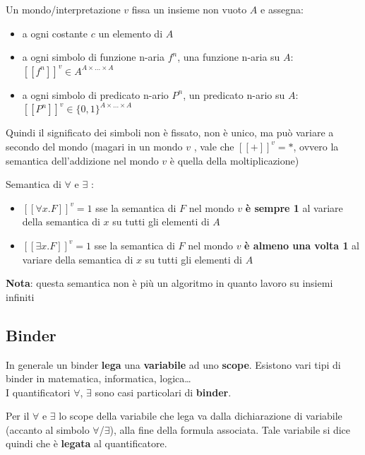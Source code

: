 \documentclass[
  a4paper,
]{article}
\providecommand{\tightlist}{%
  \setlength{\itemsep}{0pt}\setlength{\parskip}{0pt}}
\begin{document}
Un mondo/interpretazione \(v\) fissa un insieme non vuoto \(A\) e
assegna:

\begin{itemize}
\tightlist
\item
  a ogni costante \(c\) un elemento di \(A\)
\item
  a ogni simbolo di funzione n-aria \(f^n\), una funzione n-aria su
  \(A\): \([[f^n]]^v \in A^{A \times \dots \times A}\)
\item
  a ogni simbolo di predicato n-ario \(P^n\), un predicato n-ario su
  \(A\): \([[P^n]]^v \in \{0, 1\}^{A \times \dots \times A}\)
\end{itemize}

Quindi il significato dei simboli non è fissato, non è unico, ma può
variare a secondo del mondo (magari in un mondo \(v\) , vale che
\([[+]]^v = *\), ovvero la semantica dell'addizione nel mondo \(v\) è
quella della moltiplicazione)

Semantica di \(\forall\) e \(\exists\) :

\begin{itemize}
\tightlist
\item
  \([[\forall x.F]]^v = 1\) sse la semantica di \(F\) nel mondo \(v\)
  \textbf{è sempre 1} al variare della semantica di \(x\) su tutti gli
  elementi di \(A\)
\item
  \([[\exists x.F]]^v = 1\) sse la semantica di \(F\) nel mondo \(v\)
  \textbf{è almeno una volta 1} al variare della semantica di \(x\) su
  tutti gli elementi di \(A\)
\end{itemize}

\textbf{Nota}: questa semantica non è più un algoritmo in quanto lavoro
su insiemi infiniti

\hypertarget{binder}{%
\subsection{Binder}\label{binder}}

In generale un binder \textbf{lega} una \textbf{variabile} ad uno
\textbf{scope}. Esistono vari tipi di binder in matematica, informatica,
logica\ldots{}\\
I quantificatori \(\forall\), \(\exists\) sono casi particolari di
\textbf{binder}.

Per il \(\forall\) e \(\exists\) lo scope della variabile che lega va
dalla dichiarazione di variabile (accanto al simbolo
\(\forall\)/\(\exists\)), alla fine della formula associata. Tale
variabile si dice quindi che è \textbf{legata} al quantificatore.
\end{document}
